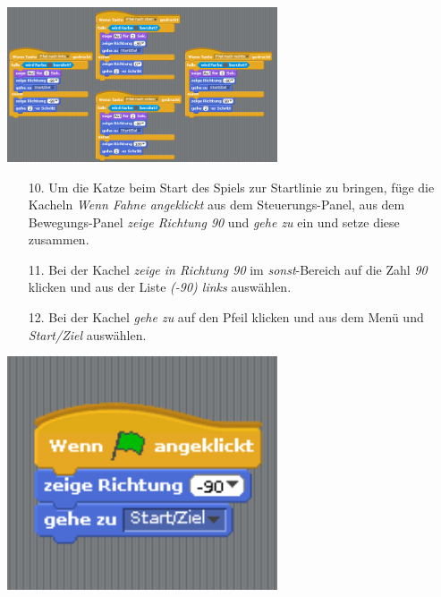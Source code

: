 \includegraphics[width=0.6\textwidth]{images/aufgabe4_katze_alle_richtungen.png}
\begin{itemize}
\item[10. ] Um die Katze beim Start des Spiels zur Startlinie zu bringen, füge die Kacheln \textit{Wenn Fahne angeklickt} aus dem Steuerungs-Panel, aus dem Bewegungs-Panel \textit{zeige Richtung 90} und \textit{gehe zu} ein und setze diese zusammen.
\item[11. ] Bei der Kachel \textit{zeige in Richtung 90} im \textit{sonst}-Bereich auf die Zahl \textit{90} klicken und aus der Liste \textit{(-90) links} auswählen.
\item[12. ] Bei der Kachel \textit{gehe zu} auf den Pfeil klicken und aus dem Menü und \textit{Start/Ziel} auswählen.
\end{itemize}
\includegraphics[width=0.6\textwidth]{images/aufgabe4_katze_an_start_stop.png}

